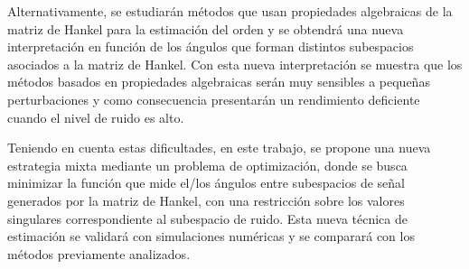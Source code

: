 Alternativamente, se estudiarán métodos que usan propiedades algebraicas de la matriz de Hankel para la estimación del orden y se obtendrá una nueva interpretación en función de los ángulos que forman distintos subespacios asociados a la matriz de Hankel. Con esta nueva interpretación se muestra que los métodos basados en propiedades algebraicas serán muy sensibles a pequeñas perturbaciones y como consecuencia presentarán un rendimiento deficiente cuando el nivel de ruido es alto. 

Teniendo en cuenta estas dificultades, en este trabajo, se propone una nueva estrategia mixta mediante un problema de optimización, donde se busca minimizar la función que mide el/los ángulos entre subespacios de señal generados por la matriz de Hankel, con una restricción sobre los valores singulares correspondiente al subespacio de ruido.  Esta nueva técnica de estimación se validará con simulaciones numéricas y se comparará con los métodos previamente analizados. 


